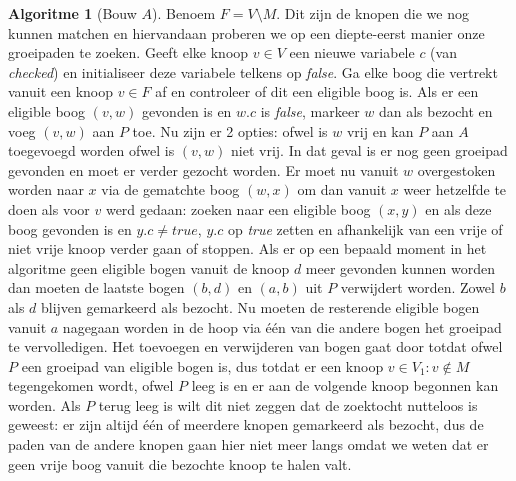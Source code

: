 \documentclass[conference]{IEEEtran}
\theoremstyle{definition}
\newtheorem{algorithmm}{Algoritme}[section]
\begin{document}
\begin{algorithmm}[Bouw $A$] \label{alg:match:match:1}
    Benoem $F = V \setminus M$. Dit zijn de knopen die we nog kunnen matchen en hiervandaan proberen we op een diepte-eerst manier onze groeipaden te zoeken. Geeft elke knoop $v \in V$ een nieuwe variabele $c$ (van \textit{checked}) en initialiseer deze variabele telkens op \textit{false}. Ga elke boog die vertrekt vanuit een knoop $v \in F$ af en controleer of dit een eligible boog is. Als er een eligible boog $(v, w)$ gevonden is en $w.c$ is \textit{false}, markeer $w$ dan als bezocht en voeg $(v, w)$ aan $P$ toe. Nu zijn er 2 opties: ofwel is $w$ vrij en kan $P$ aan $A$ toegevoegd worden ofwel is $(v, w)$ niet vrij. In dat geval is er nog geen groeipad gevonden en moet er verder gezocht worden. Er moet nu vanuit $w$ overgestoken worden naar $x$ via de gematchte boog $(w, x)$ om dan vanuit $x$ weer hetzelfde te doen als voor $v$ werd gedaan: zoeken naar een eligible boog $(x, y)$ en als deze boog gevonden is en $y.c \neq true$, $y.c$ op \textit{true} zetten en afhankelijk van een vrije of niet vrije knoop verder gaan of stoppen. Als er op een bepaald moment in het algoritme geen eligible bogen vanuit de knoop $d$ meer gevonden kunnen worden dan moeten de laatste bogen $(b, d)$ en $(a, b)$ uit $P$ verwijdert worden. Zowel $b$ als $d$ blijven gemarkeerd als bezocht. Nu moeten de resterende eligible bogen vanuit $a$ nagegaan worden in de hoop via één van die andere bogen het groeipad te vervolledigen. Het toevoegen en verwijderen van bogen gaat door totdat ofwel $P$ een groeipad van eligible bogen is, dus totdat er een knoop $v \in V_1: v \notin M$ tegengekomen wordt, ofwel $P$ leeg is en er aan de volgende knoop begonnen kan worden. Als $P$ terug leeg is wilt dit niet zeggen dat de zoektocht nutteloos is geweest: er zijn altijd één of meerdere knopen gemarkeerd als bezocht, dus de paden van de andere knopen gaan hier niet meer langs omdat we weten dat er geen vrije boog vanuit die bezochte knoop te halen valt.
\end{algorithmm}

\end{document}
